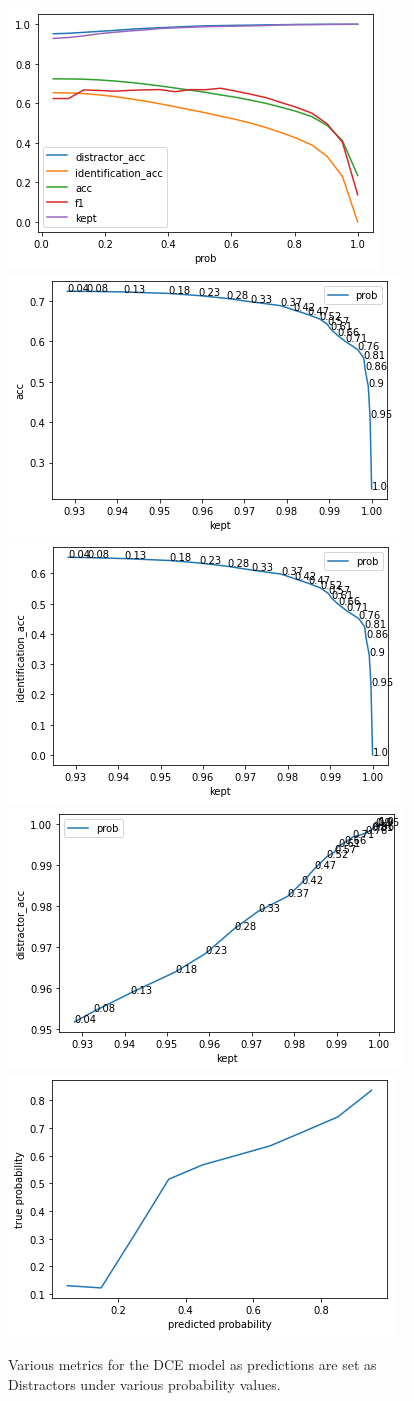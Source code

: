 \begin{figure}
    \centering
    \includegraphics[width=0.45\columnwidth]{50-files/dce-all.png}
    \includegraphics[width=0.45\columnwidth]{50-files/dce-acc-kept.png}
    \includegraphics[width=0.45\columnwidth]{50-files/dce-id-kept.png}
    \includegraphics[width=0.45\columnwidth]{50-files/dce-distr-kept.png}
    \includegraphics[width=0.45\columnwidth]{50-files/dce-calibration.png}
    \caption{Various metrics for the DCE model as predictions are set as Distractors under various probability values.}
    \label{fig:dce-plots}
\end{figure}



